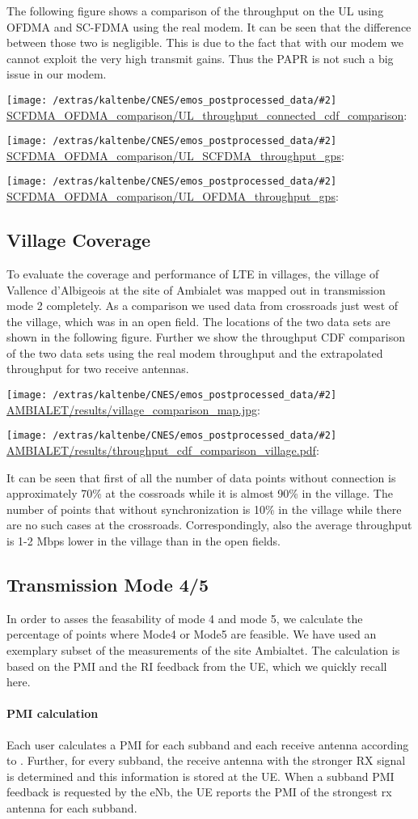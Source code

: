 \documentclass[a4paper,10pt]{article}
\newcommand{\printfile}[2][]{
 \begin{minipage}{8cm}
  \centering
  \texttt{[image: /extras/kaltenbe/CNES/emos\_postprocessed\_data/\#2]}
  \url{#2}: #1

 \end{minipage}
}
\begin{document}
The following figure shows a comparison of the throughput on the UL using OFDMA and SC-FDMA using the real modem. It can be seen that the difference between those two is negligible. This is due to the fact that with our modem we cannot exploit the very high transmit gains. Thus the PAPR is not such a big issue in our modem. 


\printfile{SCFDMA_OFDMA_comparison/UL_throughput_connected_cdf_comparison}

\printfile{SCFDMA_OFDMA_comparison/UL_SCFDMA_throughput_gps}
\printfile{SCFDMA_OFDMA_comparison/UL_OFDMA_throughput_gps}

\subsection{Village Coverage}

To evaluate the coverage and performance of LTE in villages, the village of Vallence d'Albigeois at the site of Ambialet was mapped out in transmission mode 2 completely. As a comparison we used data from crossroads just west of the village, which was in an open field. The locations of the two data sets are shown in the following figure. Further we show the throughput CDF comparison of the two data sets using the real modem throughput and the extrapolated throughput for two receive antennas. 

\printfile{AMBIALET/results/village_comparison_map.jpg}
\printfile{AMBIALET/results/throughput_cdf_comparison_village.pdf}

It can be seen that first of all the number of data points without connection is approximately 70\% at the cossroads while it is almost 90\% in the village. The number of points that without synchronization is 10\% in the village while there are no such cases at the crossroads. Correspondingly, also the average throughput is 1-2 Mbps lower in the village than in the open fields. 

\subsection{Transmission Mode 4/5}
In order to asses the feasability of mode 4 and mode 5, we calculate the percentage of points where Mode4 or Mode5 are feasible. We have used an exemplary subset of the measurements of the site Ambialtet. The calculation is based on the PMI and the RI feedback from the UE, which we quickly recall here.

\paragraph{PMI calculation}
Each user calculates a PMI for each subband and each receive antenna according to \cite{ghaffar10b}. Further, for every subband, the receive antenna with the stronger RX signal is determined and this information is stored at the UE. When a subband PMI feedback is requested by the eNb, the UE reports the PMI of the strongest rx antenna for each subband. 
\end{document}
